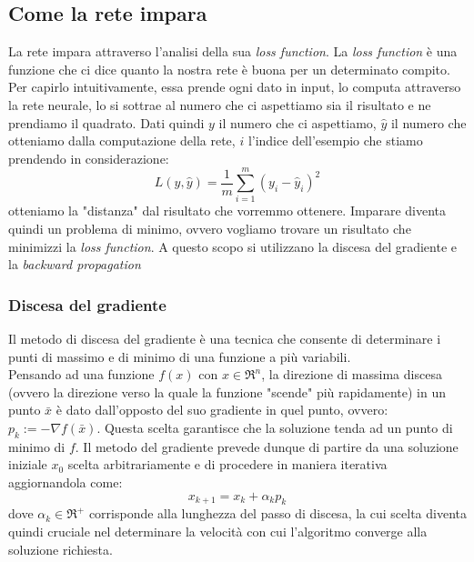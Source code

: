 \subsection*{Come la rete impara}
La rete impara attraverso l'analisi della sua \textit{loss function}. La \textit{loss function} è una funzione che ci dice quanto la nostra rete è buona per un determinato compito. Per capirlo intuitivamente, essa prende ogni dato in input, lo computa attraverso la rete neurale, lo si sottrae al numero che ci aspettiamo sia il risultato e ne prendiamo il quadrato. Dati quindi $y$ il numero che ci aspettiamo, $\hat{y}$ il numero che otteniamo dalla computazione della rete, $i$ l'indice dell'esempio che stiamo prendendo in considerazione: 
\[L(y, \hat{y})=\frac{1}{m}\sum_{i=1}^{m}(y_i - \hat{y}_i)^2 \]
otteniamo la "distanza" dal risultato che vorremmo ottenere. Imparare diventa quindi un problema di minimo, ovvero vogliamo trovare un risultato che minimizzi la \textit{loss function}. A questo scopo si utilizzano la discesa del gradiente e la \textit{backward propagation}

\subsubsection*{Discesa del gradiente}
Il metodo di discesa del gradiente è una tecnica che consente di determinare i punti di massimo e di minimo di una funzione a più variabili.
\\Pensando ad una funzione $f(x)$ con $x\in \Re^n$, la direzione di massima discesa (ovvero la direzione verso la quale la funzione "scende" più rapidamente) in un punto $\bar{x}$ è dato dall'opposto del suo gradiente in quel punto, ovvero: $p_k:=-\nabla f(\bar{x})$. Questa scelta garantisce che la soluzione tenda ad un punto di minimo di $f$. Il metodo del gradiente prevede dunque di partire da una soluzione iniziale $x_0$ scelta arbitrariamente e di procedere in maniera iterativa aggiornandola come:
\[x_{k+1} = x_k + \alpha_kp_k\]
dove $\alpha_k\in \Re^+$ corrisponde alla lunghezza del passo di discesa, la cui scelta diventa quindi cruciale nel determinare la velocità con cui l'algoritmo converge alla soluzione richiesta.

